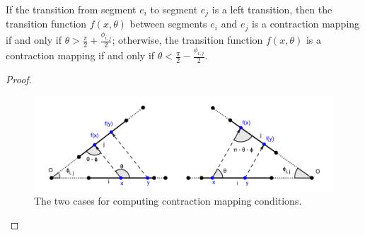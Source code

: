 \documentclass[]{styles/svproc}  %
\begin{document}
\begin{lemma} \label{lemma:angrange}
If the transition from segment $e_i$ to segment $e_j$ is a left transition, then the
transition function $f(x, \theta)$ between segments $e_i$ and $e_j$ is a contraction
mapping if and only if $\theta > \frac{\pi}{2}+\frac{\phi_{i, j}}{2}$;
otherwise, the transition function $f(x, \theta)$ is a contraction mapping if
and only if $\theta < \frac{\pi}{2}-\frac{\phi_{i, j}}{2}$.
\end{lemma}
\begin{proof}

\begin{figure}
    \includegraphics[width=1\linewidth]{figures/contraction_map_cond.png}
    \centering
    \caption{The two cases for computing contraction mapping conditions. \label{fig:cont_map}}
    \centering
\end{figure}


\end{proof}
\end{document}
